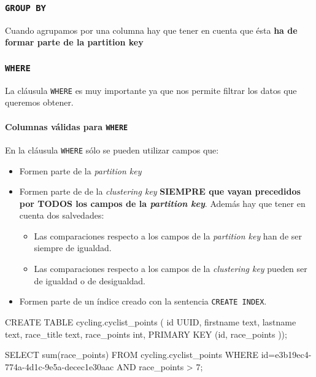 \documentclass[
]{book}
\newenvironment{Shaded}{}{}
\newcommand{\NormalTok}[1]{#1}
\providecommand{\tightlist}{%
  \setlength{\itemsep}{0pt}\setlength{\parskip}{0pt}}
\begin{document}
\subsubsection{\texorpdfstring{\texttt{GROUP\ BY}}{GROUP BY}}\label{group-by}

Cuando agrupamos por una columna hay que tener en cuenta que ésta \textbf{ha de formar parte de la partition key}

\subsubsection{\texorpdfstring{\texttt{WHERE}}{WHERE}}\label{where}

La cláusula \texttt{WHERE} es muy importante ya que nos permite filtrar los datos que queremos obtener.

\paragraph{\texorpdfstring{Columnas válidas para \texttt{WHERE}}{Columnas válidas para WHERE}}\label{columnas-vuxe1lidas-para-where}

En la cláusula \texttt{WHERE} sólo se pueden utilizar campos que:

\begin{itemize}
\tightlist
\item
  Formen parte de la \emph{partition key}
\item
  Formen parte de de la \emph{clustering key} \textbf{SIEMPRE que vayan precedidos por TODOS los campos de la \emph{partition key}}. Además hay que tener en cuenta dos salvedades:

  \begin{itemize}
  \tightlist
  \item
    Las comparaciones respecto a los campos de la \emph{partition key} han de ser siempre de igualdad.
  \item
    Las comparaciones respecto a los campos de la \emph{clustering key} pueden ser de igualdad o de desigualdad.
  \end{itemize}
\item
  Formen parte de un índice creado con la sentencia \texttt{CREATE\ INDEX}.
\end{itemize}

\begin{Shaded}
\begin{Highlighting}[]
\NormalTok{CREATE TABLE cycling.cyclist\_points (}
\NormalTok{   id UUID, }
\NormalTok{   firstname text, }
\NormalTok{   lastname text, }
\NormalTok{   race\_title text, }
\NormalTok{   race\_points int, }
\NormalTok{   PRIMARY KEY (id, race\_points ));}

\NormalTok{SELECT sum(race\_points) }
\NormalTok{FROM cycling.cyclist\_points }
\NormalTok{WHERE id=e3b19ec4{-}774a{-}4d1c{-}9e5a{-}decec1e30aac }
\NormalTok{      AND race\_points \textgreater{} 7;}
\end{Highlighting}
\end{Shaded}
\end{document}
